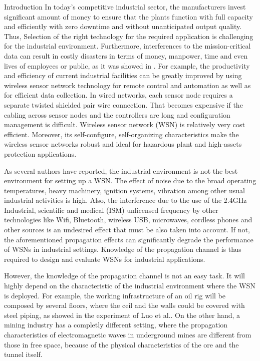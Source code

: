 \documentclass[11pt,a4paper, twocolum]{article}
\makeatletter
\numberwithin{equation}{section}
\numberwithin{figure}{section}
\numberwithin{table}{section}
\def\section{\@startsection {section}{1}{\z@}{24pt plus 2pt minus 2pt}
{12pt plus 2pt minus 2pt}{\large\bf}}
\makeatother
\begin{document}
\section{Introduction}
In today’s competitive industrial sector, the manufacturers invest significant amount of money to ensure that the plants function with full capacity and efficiently with zero downtime and without unanticipated output quality. Thus, Selection of the right technology for the required application is challenging for the industrial environment. Furthermore, interferences to the mission-critical data can result in costly disasters in terms of money, manpower, time and even lives of employees or public\cite{low2005wireless}, as it was showed in \cite{bowie}.
For example, the productivity and efficiency of current industrial facilities can be greatly improved by using wireless sensor network technology for remote control and automation as well as for efficient data collection\cite{cheffena2016propagation}.
In wired networks, each sensor node requires a separate twisted shielded pair wire connection. That becomes expensive if the cabling across sensor nodes and the controllers are long and configuration management is difficult. Wireless sensor network (WSN) is relatively very cost efficient. Moreover, its self-configure, self-organizing characteristics make the wireless sensor networks robust and ideal for hazardous plant and high-assets protection applications\cite{low2005wireless}.

As several authors have reported\cite{low2005wireless, cheffena2012industrial, luo2011rf}, the industrial environment is not the best environment for setting up a WSN. The effect of noise due to the broad operating temperatures, heavy machinery, ignition systems, vibration among other usual industrial activities is high.  Also, the interference due to the use of the 2.4GHz Industrial, scientific and medical (ISM) unlicensed frequency by other technologies like Wifi, Bluetooth, wireless USB, microwaves, cordless phones and other sources is an undesired effect that must be also taken into account. If not, the aforementioned propagation effects can significantly degrade the performance of WSNs in industrial settings. Knowledge of the propagation channel is thus required to design and evaluate WSNs for industrial applications\cite{cheffena2016propagation}.

However, the knowledge of the propagation channel is not an easy task.  It will highly depend on the characteristic of the industrial environment where the WSN is deployed.  For example, the working infrastructure of an oil rig will be composed by several floors, where the ceil and the walls could be covered with steel piping, as showed in the experiment of Luo et al.\cite{luo2011rf}.  On the other hand, a mining industry has a completly different setting, where the propagation characteristics of electromagnetic waves in underground mines are different from those in free space, because of the physical characteristics of the ore and the tunnel itself\cite{farjow2015novel,sun2010channel, grote2009wireless}.
\end{document}
